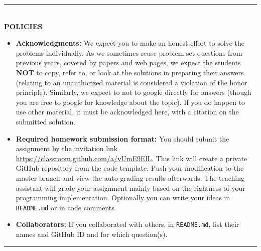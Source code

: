 \vspace{3em}

\rule{\textwidth}{1pt}
\\
\textbf{POLICIES}
\begin{itemize}
\item {\bf Acknowledgments: \/} 
  We expect you to make an honest effort to solve the problems individually.  As we sometimes reuse problem set questions from previous years, covered by papers and web pages, we expect the students \textbf{NOT} to copy, refer to, or look at the solutions in preparing their answers (relating to an unauthorized material is considered a violation of the honor principle). Similarly, we expect to not to google directly for answers (though you are free to google for knowledge about the topic). If you do happen to use other material, it must be acknowledged here, with a citation on the submitted solution.
  
\item {\bf Required homework submission format: \/} 
  You should submit the assignment by the invitation link \url{https://classroom.github.com/a/vUmE9ElL}. This link will create a private GitHub repository from the code template.
  Push your modification to the master branch and view the auto-grading results afterwards. The teaching assistant will grade your
  assignment mainly based on the rightness of your programming implementation.
  Optionally you can write your ideas in \texttt{README.md} or in code comments.
  

\item {\bf Collaborators: \/}
If you collaborated with others, in \texttt{README.md}, list their names and GitHub ID and for which question(s).
\end{itemize}
\rule{\textwidth}{1pt}
